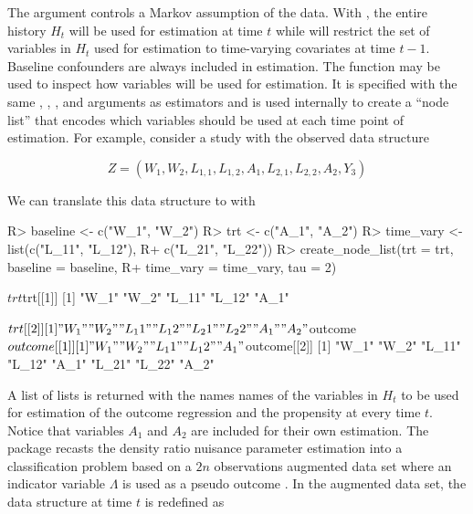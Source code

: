 \documentclass[]{jss}
\begin{document}
The  argument controls a Markov assumption of the data. With
, the entire history \(H_t\) will be used for estimation
at time \(t\) while  will restrict the set of variables in
\(H_t\) used for estimation to time-varying covariates at time \(t - 1\). 
Baseline confounders are always included in estimation. The 
 function may be used to inspect how variables
will be used for estimation. It is specified with the same ,
, , and  arguments as 
estimators and is used internally to create a ``node list'' that encodes
which variables should be used at each time point of estimation. For
example, consider a study with the observed data structure

\begin{equation}
Z = (W_1, W_2, L_{1, 1}, L_{1, 2}, A_1, L_{2, 1}, L_{2, 2}, A_2, Y_3)
\end{equation}

We can translate this data structure to  with

\begin{CodeChunk}

\begin{CodeInput}
R> baseline <- c("W_1", "W_2")
R> trt <- c("A_1", "A_2")
R> time_vary <- list(c("L_11", "L_12"), 
R+                   c("L_21", "L_22"))
R> create_node_list(trt = trt, baseline = baseline, 
R+                  time_vary = time_vary, tau = 2)
\end{CodeInput}

\begin{CodeOutput}
$trt
$trt[[1]]
[1] "W_1"  "W_2"  "L_11" "L_12" "A_1" 

$trt[[2]]
[1] "W_1"  "W_2"  "L_11" "L_12" "L_21" "L_22" "A_1"  "A_2" 


$outcome
$outcome[[1]]
[1] "W_1"  "W_2"  "L_11" "L_12" "A_1" 

$outcome[[2]]
[1] "W_1"  "W_2"  "L_11" "L_12" "A_1"  "L_21" "L_22" "A_2" 
\end{CodeOutput}
\end{CodeChunk}

A list of lists is returned with the names
names of the variables in \(H_t\) to be used for estimation of
the outcome regression and the propensity at every time \(t\).
Notice that variables \(A_1\) and \(A_2\) are included for their own
estimation. The  package recasts the density ratio nuisance
parameter estimation into a classification problem based on a \(2n\)
observations augmented data set where an indicator variable \(\Lambda\)
is used as a pseudo outcome
\citep{chengSemiparametricDensityEstimation2004, qinInferencesCaseControlSemiparametric1998}.
In the augmented data set, the data structure at time \(t\) is
redefined as
\end{document}
